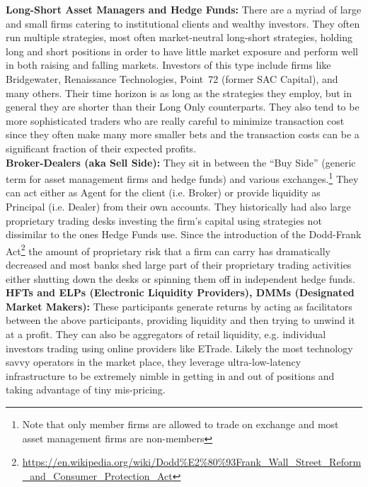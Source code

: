 \noindent\textbf{ Long-Short Asset Managers and Hedge Funds:} There are a myriad of large and small firms catering to institutional clients and wealthy investors. They often run multiple strategies, most often market-neutral long-short strategies, holding long and short positions in order to have little market exposure and  perform well in both raising and falling markets. Investors of this type include firms like Bridgewater, Renaissance Technologies, Point~72 (former SAC Capital), and many others. Their time horizon is as long as the strategies they employ, but in general they are shorter than their Long Only counterparts. They also tend to be more sophisticated traders who are really careful to minimize transaction cost since they often make many more smaller bets and the transaction costs can be a significant fraction of their expected profits. \\


\noindent\textbf{Broker-Dealers (aka Sell Side):} They sit in between the ``Buy Side'' (generic term for asset management firms and hedge funds) and various exchanges.\footnote{Note that only member firms are allowed to trade on exchange and most asset management firms are non-members} They can act either as Agent for the client (i.e. Broker) or provide liquidity as Principal (i.e. Dealer) from their own accounts. They historically had  also large proprietary trading desks investing the firm's capital using strategies not dissimilar to the ones Hedge Funds use. Since the introduction of the Dodd-Frank Act\footnote{\url{https://en.wikipedia.org/wiki/Dodd\%E2\%80\%93Frank_Wall_Street_Reform_and_Consumer_Protection_Act}} the amount of proprietary risk that a firm can carry has dramatically decreased and most banks shed large part of their proprietary trading activities either shutting down the desks or spinning them off in independent hedge funds. \\


\noindent\textbf{HFTs and ELPs (Electronic Liquidity Providers), DMMs (Designated Market Makers):} These participants generate returns by acting as facilitators between the above participants, providing liquidity and then trying to unwind it at a profit. They can also be aggregators of retail liquidity, e.g. individual investors trading using online providers like ETrade. Likely the most technology savvy operators in the market place, they leverage ultra-low-latency infrastructure to be extremely nimble in getting in and out of positions and taking advantage of tiny mis-pricing. 


